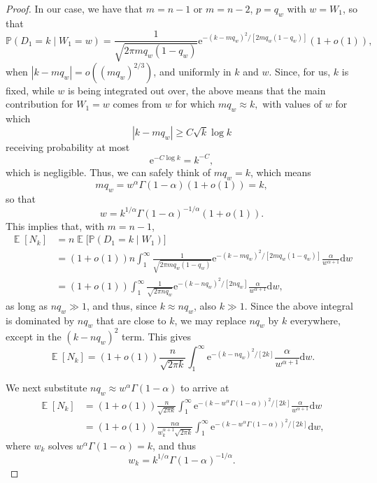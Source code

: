 \documentclass[ twocolumn,
 amsmath,amssymb,
 aps, pre, amsthm, amsfonts,
]{revtex4-2}
\DeclareMathOperator{\EX}{\mathbb{E}}%
\newcommand{\prob}{\mathbb{P}}
\newcommand{\nn}{\nonumber}
\begin{document}
\begin{proof}
In our case, we have that $m=n-1$ or $m=n-2$, $p=q_w$ with $w=W_1$, so that
\begin{equation}
    \prob(D_1=k\mid W_1=w)
	=\frac{1}{\sqrt{2 \pi mq_w(1-q_w)}}{\mathrm{e}}^{-(k-mq_w)^2/[2mq_w(1-q_w)]}(1+o(1)),
\end{equation}
when $|k-mq_w|=o((mq_w)^{2/3})$, and uniformly in $k$ and $w$. Since, for us, $k$ is fixed, while $w$ is being integrated out over, the above means that the main contribution for $W_1=w$ comes from $w$ for which $mq_w\approx k,$ with values of $w$ for which
\begin{equation}
    |k-mq_w|\geq C\sqrt{k}\log{k}
\end{equation}
receiving probability at most
\begin{equation}
    {\mathrm{e}}^{-C\log{k}}=k^{-C},
\end{equation}
which is negligible. Thus, we can safely think of $mq_w=k$, which means
\begin{equation}
    mq_w=w^{\alpha} \Gamma(1-\alpha)(1+o(1))=k,
\end{equation}
so that
\begin{equation}
    w=k^{1/\alpha} \Gamma(1-\alpha)^{-1/\alpha} (1+o(1)).
\end{equation}
This implies that, with $m=n-1$,
\begin{align}
    \EX[N_k] &=n\EX\big[\prob(D_1=k\mid W_1)\big]\\
	&=(1+o(1)) n\int_1^{\infty} \frac{1}{\sqrt{2 \pi mq_w(1-q_w)}}{\mathrm{e}}^{-(k-mq_w)^2/[2mq_w(1-q_w)]}\frac{\alpha}{w^{\alpha+1}}
	{\mathrm d}w\nn\\
	&= (1+o(1)) \int_1^{\infty} \frac{1}{\sqrt{2 \pi nq_w}}{\mathrm{e}}^{-(k-nq_w)^2/[2nq_w]}\frac{\alpha}{w^{\alpha+1}}
	{\mathrm d}w,\nn
\end{align}
as long as $nq_w\gg 1$, and thus, since $k\approx nq_w$, also $k\gg 1$. Since the above integral is dominated by $ nq_w$ that are close to $k$, we may replace $nq_w$ by $k$ everywhere, except in the $(k-nq_w)^2$ term. This gives
\begin{equation}
    \EX[N_k] = (1+o(1)) \frac{n}{\sqrt{2 \pi k}}\int_1^{\infty} {\mathrm{e}}^{-(k-nq_w)^2/[2k]}\frac{\alpha}{w^{\alpha+1}}
	{\mathrm d}w.
\end{equation}

We next substitute $nq_w\approx w^{\alpha} \Gamma(1-\alpha)$ to arrive at
\begin{align}
    \EX[N_k] &= (1+o(1)) \frac{n}{\sqrt{2 \pi k}}\int_1^{\infty} {\mathrm{e}}^{-(k-w^{\alpha} \Gamma(1-\alpha))^2/[2k]}\frac{\alpha}{w^{\alpha+1}}
	{\mathrm d}w \\
	&=(1+o(1)) \frac{n\alpha }{w_k^{\alpha+1}\sqrt{2 \pi k}}\int_1^{\infty} {\mathrm{e}}^{-(k-w^{\alpha} \Gamma(1-\alpha))^2/[2k]}
	{\mathrm d}w,\nn
\end{align}
where $w_k$ solves $w^{\alpha} \Gamma(1-\alpha)=k$, and thus
\begin{equation}
    w_k=k^{1/\alpha}  \Gamma(1-\alpha)^{-1/\alpha}.
\end{equation}


\end{proof}
\end{document}
